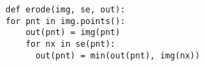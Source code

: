 \documentclass[varwidth=4cm, border={0.1cm 0.1cm 0.1cm 0.1cm}]{standalone}
\begin{document}
\begin{verbatim}
def erode(img, se, out):
for pnt in img.points():
    out(pnt) = img(pnt)
    for nx in se(pnt):
      out(pnt) = min(out(pnt), img(nx))
\end{verbatim}
\end{document}
